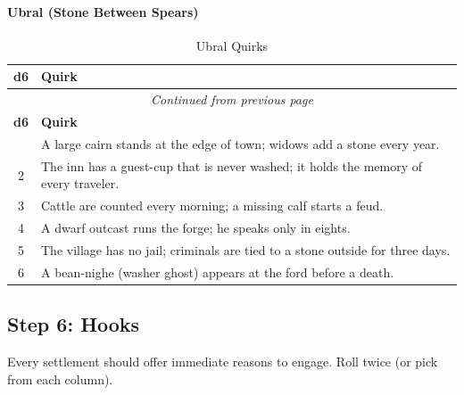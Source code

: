 \paragraph{Ubral (Stone Between Spears)}
\begin{center}
\begin{longtable}{cl}
\caption{Ubral Quirks}\\
\toprule
\textbf{d6} & \textbf{Quirk} \\
\midrule
\endfirsthead
\multicolumn{2}{c}{\emph{Continued from previous page}} \\
\toprule
\textbf{d6} & \textbf{Quirk} \\
\midrule
\endhead
\bottomrule
\endfoot
1 & A large cairn stands at the edge of town; widows add a stone every year. \\
2 & The inn has a guest-cup that is never washed; it holds the memory of every traveler. \\
3 & Cattle are counted every morning; a missing calf starts a feud. \\
4 & A dwarf outcast runs the forge; he speaks only in eights. \\
5 & The village has no jail; criminals are tied to a stone outside for three days. \\
6 & A bean-nighe (washer ghost) appears at the ford before a death. \\
\end{longtable}
\end{center}

\subsection{Step 6: Hooks}
\label{sec:settlement-hooks}
Every settlement should offer immediate reasons to engage. Roll twice (or pick from each column).

